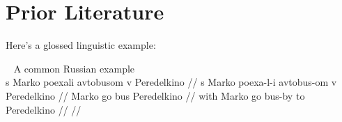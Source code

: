 \chapter{Prior Literature\label{chap:priorliterature}}

\lipsum[36]
Here's a glossed linguistic example:

\pex[glstyle=multilevel]~ A common Russian example \\
  \begingl
   {s} {Marko} {poexali} {avtobusom} {v} {Peredelkino} //
   {s} {Marko} {poexa-l-i} {avtobus-om} {v} {Peredelkino} //
   {} {Marko\abr{}} {go} {bus} {} {Peredelkino\abr{}} //
   {with} {Marko} {go} {bus-by} {to} {Peredelkino} //
  \glft {} //
  \endgl
\xe

\lipsum[37-40]
